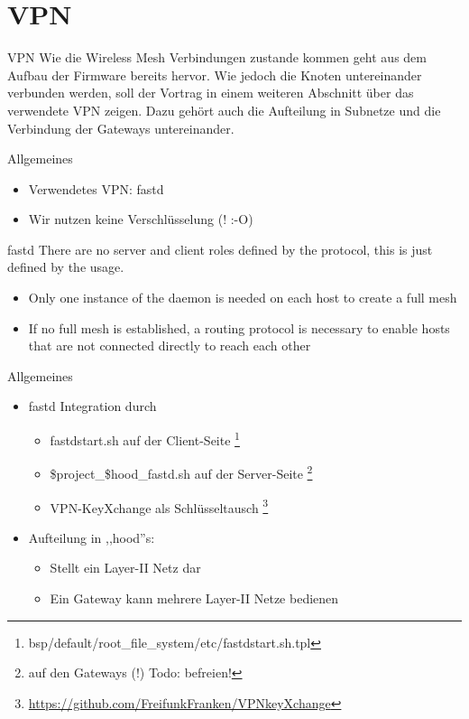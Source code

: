 \section{VPN}

\begin{frame}{VPN}
Wie die Wireless Mesh Verbindungen zustande kommen geht aus dem
Aufbau der Firmware bereits hervor. Wie jedoch die Knoten
untereinander verbunden werden, soll der Vortrag in einem weiteren
Abschnitt über das verwendete VPN zeigen. Dazu gehört auch die
Aufteilung in Subnetze und die Verbindung der Gateways
untereinander.
\end{frame}

\begin{frame}{Allgemeines}
    \begin{itemize}
        \item Verwendetes VPN: fastd
        \item Wir nutzen keine Verschlüsselung (! :-O)
    \end{itemize}
    \begin{block}{fastd}
        There are no server and client roles defined by the
        protocol, this is just defined by the usage.
        \begin{itemize}
            \item Only one instance of the daemon is needed on each
                host to create a full mesh
            \item If no full mesh is established, a routing protocol
                is necessary to enable hosts that are not connected
                directly to reach each other
        \end{itemize}
    \end{block}
\end{frame}

\begin{frame}{Allgemeines}
    \begin{itemize}
        \item fastd Integration durch
        \begin{itemize}
            \item fastdstart.sh auf der Client-Seite
                \footnote{bsp/default/root\_file\_system/etc/fastdstart.sh.tpl}
            \item \$project\_\$hood\_fastd.sh auf der Server-Seite
                \footnote{auf den Gateways (!) Todo: befreien!}
            \item VPN-KeyXchange als Schlüsseltausch
                \footnote{\url{https://github.com/FreifunkFranken/VPNkeyXchange}}
        \end{itemize}
        \item Aufteilung in ,,hood''s:
        \begin{itemize}
            \item Stellt ein Layer-II Netz dar
            \item Ein Gateway kann mehrere Layer-II Netze bedienen
        \end{itemize}
    \end{itemize}
\end{frame}

